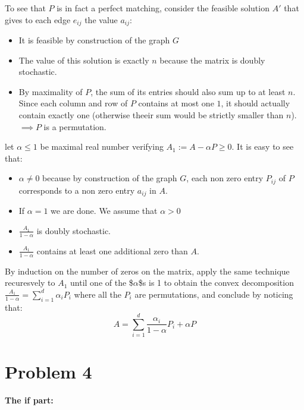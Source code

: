 \documentclass[11pt]{article}
\begin{document}
To see that \(P\) is in fact a perfect matching, consider the feasible solution \(A'\) that gives to each edge \(e_{ij}\) the value \(a_{ij}\):

\begin{itemize}
\item It is feasible by construction of the graph \(G\)
\item The value of this solution is exactly \(n\) because the matrix is doubly stochastic.
\item By maximality of \(P\), the sum of its entries should also sum up to at least \(n\). Since each column and row of \(P\) contains at most one \(1\), it should actually contain exactly one (otherwise theeir sum would be strictly smaller than \(n\)).  \(\implies P\) is a permutation.
\end{itemize}


let \(\alpha \le 1\) be maximal real number verifying \(A_1 := A - \alpha P \ge 0\). It is easy to see that:
\begin{itemize}
\item \(\alpha \ne 0\) because by construction of the graph \(G\), each non zero entry \(P_{ij}\) of \(P\) corresponds to a non zero entry \(a_{ij}\) in \(A\).
\item If \(\alpha = 1\) we are done. We assume that \(\alpha > 0\)
\item \(\frac{A_1}{1-\alpha}\) is doubly stochastic.
\item \(\frac{A_1}{1-\alpha}\) contains at least one additional zero than \(A\).
\end{itemize}

By induction on the number of zeros on the matrix, apply the same technique recuresvely to \(A_1\) until one of the \$\(\alpha\)\$s is 1 to obtain the convex decomposition \(\frac{A_1}{1-\alpha} = \sum_{i=1}^d \alpha_i P_i\) where all the \(P_i\) are permutations, and conclude by noticing that:
$$A = \sum_{i=1}^d \frac{\alpha_i}{1-\alpha} P_i + \alpha P$$


\section{Problem 4}
\label{sec:orgheadline4}

\textbf{The if part:}
\end{document}
